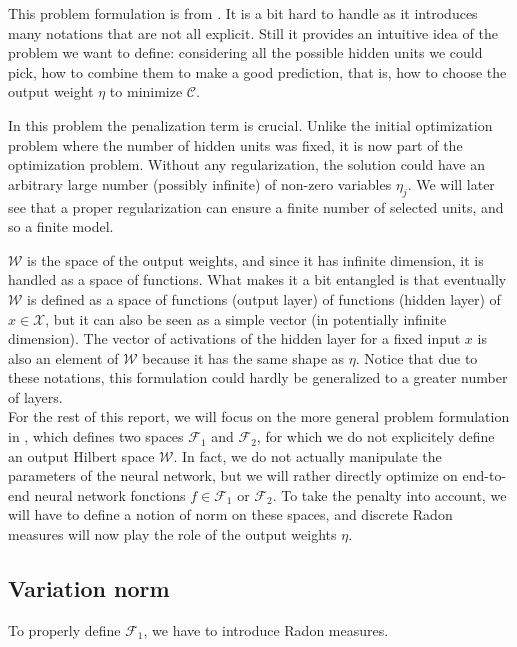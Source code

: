 \documentclass[a4paper, 11pt]{scrartcl}
\begin{document}
This problem formulation is from \cite{bengio2006convex}. It is a bit hard to handle as it introduces many notations that are not all explicit. Still it provides an intuitive idea of the problem we want to define: considering all the possible hidden units we could pick, how to combine them to make a good prediction, that is, how to choose the output weight $\eta$ to minimize $\mathcal{C}$. 

In this problem the penalization term is crucial. Unlike the initial optimization problem where the number of hidden units was fixed, it is now part of the optimization problem. Without any regularization, the solution could have an arbitrary large number (possibly infinite) of non-zero variables $\eta_j$. We will later see that a proper regularization can ensure a finite number of selected units, and so a finite model.

$\mathcal{W}$ is the space of the output weights, and since it has infinite dimension, it is handled as a space of functions. What makes it a bit entangled is that eventually $\mathcal{W}$ is defined as a space of functions (output layer) of functions (hidden layer) of $x\in \mathcal{X}$, but it can also be seen as a simple vector (in potentially infinite dimension). The vector of activations of the hidden layer for a fixed input $x$ is also an element of $\mathcal{W}$ because it has the same shape as $\eta$. Notice that due to these notations, this formulation could hardly be generalized to a greater number of layers.\\

For the rest of this report, we will focus on the more general problem formulation in \cite{bach2017breaking}, which defines two spaces $\mathcal{F}_1$ and $\mathcal{F}_2$, for which we do not explicitely define an output Hilbert space $\mathcal{W}$. In fact, we do not actually manipulate the parameters of the neural network, but we will rather directly optimize on end-to-end neural network fonctions $f \in \mathcal{F}_1$ or $\mathcal{F}_2$. To take the penalty into account, we will have to define a notion of norm on these spaces, and discrete Radon measures will now play the role of the output weights $\eta$.

\subsection{Variation norm}

To properly define $\mathcal{F}_1$, we have to introduce Radon measures.
\end{document}
